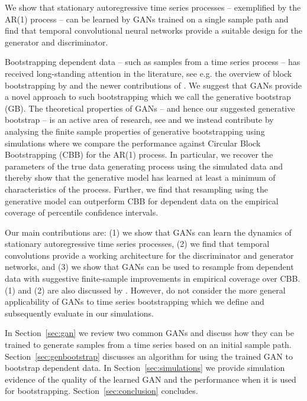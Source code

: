 \documentclass[12pt]{article}
\begin{document}
We show that stationary autoregressive time series processes -- exemplified by the AR(1) process -- can be learned by GANs trained on a single sample path and find that temporal convolutional neural networks provide a suitable design for the generator and discriminator. 

Bootstrapping dependent data -- such as samples from a time series process -- has received long-standing attention in the literature, see e.g. the overview of block bootstrapping by \citet{lahiri1999theoretical} and the newer contributions of \citet{politis2001tapered,shao2010wild}. We suggest that GANs provide a novel approach to such bootstrapping which we call the generative bootstrap (GB). The theoretical properties of GANs -- and hence our suggested generative bootstrap -- is an active area of research, see \citep{biau2018theoretical,biau2020theoretical,haas2020statistical} and we instead contribute by analysing the finite sample properties of generative bootstrapping using simulations where we compare the performance against Circular Block Bootstrapping (CBB) \citep{politis1992circular} for the AR(1) process. In particular, we recover the parameters of the true data generating process using the simulated data and thereby show that the generative model has learned at least a minimum of characteristics of the process. Further, we find that resampling using the generative model can outperform CBB for dependent data on the empirical coverage of percentile confidence intervals.

Our main contributions are: (1) we show that GANs can learn the dynamics of stationary autoregressive time series processes, (2) we find that temporal convolutions provide a working architecture for the discriminator and generator networks, and (3) we show that GANs can be used to resample from dependent data with suggestive finite-sample improvements in empirical coverage over CBB. (1) and (2) are also discussed by \citet{wiese2020quantgan}. However, \citet{wiese2020quantgan} do not consider the more general applicability of GANs to time series bootstrapping which we define and subsequently evaluate in our simulations.

In Section~\ref{sec:gan} we review two common GANs and discuss how they can be trained to generate samples from a time series based on an initial sample path. Section~\ref{sec:genbootstrap} discusses an algorithm for using the trained GAN to bootstrap dependent data. In Section~\ref{sec:simulations} we provide simulation evidence of the quality of the learned GAN and the performance when it is used for bootstrapping. Section~\ref{sec:conclusion} concludes.
\end{document}
